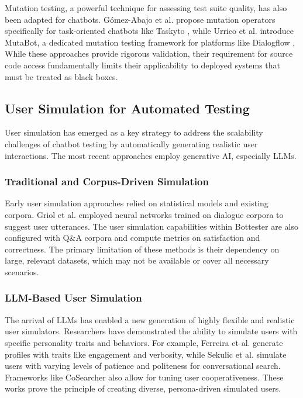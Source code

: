 Mutation testing, a powerful technique for assessing test suite quality,
has also been adapted for chatbots.
Gómez-Abajo et al. \autocite{gomez-abajoMutationTestingTaskOriented2024}
propose mutation operators specifically for task-oriented chatbots like Taskyto \autocite{sanchezcuadradoAutomatingDevelopmentTaskoriented2024},
while Urrico et al. \autocite{urricoMutaBotMutationTesting2024} introduce MutaBot,
a dedicated mutation testing framework for platforms like Dialogflow \autocite{Dialogflow},
While these approaches provide rigorous validation,
their requirement for source code access
fundamentally limits their applicability to deployed systems
that must be treated as black boxes.

\subsection{User Simulation for Automated Testing}

User simulation has emerged as a key strategy to
address the scalability challenges of chatbot testing
by automatically generating realistic user interactions.
The most recent approaches employ generative \acl{AI},
especially \acp {LLM}.

\subsubsection{Traditional and Corpus-Driven Simulation}

Early user simulation approaches
relied on statistical models and existing corpora.
Griol et al. \autocite{griolAutomaticDialogSimulation2013}
employed neural networks trained on dialogue corpora
to suggest user utterances.
The user simulation capabilities within Bottester
\autocite{vasconcelosBottesterTestingConversational2017}
are also configured with Q\&A corpora
and compute metrics on satisfaction and correctness.
The primary limitation of these methods is
their dependency on large, relevant datasets,
which may not be available or cover all necessary scenarios.

\subsubsection{LLM-Based User Simulation}

The arrival of \acp{LLM} has enabled a new generation
of highly flexible and realistic user simulators.
Researchers have demonstrated the ability
to simulate users with specific personality traits and behaviors.
For example, Ferreira et al. \autocite{ferreiraMultitraitUserSimulation2024}
generate profiles with traits like engagement and verbosity,
while Sekulic et al. \autocite{sekulicSimulatingConversationalSearch2024}
simulate users with varying levels of patience and politeness for conversational search.
Frameworks like CoSearcher \autocite{salleStudyingEffectivenessConversational2021}
also allow for tuning user cooperativeness.
These works prove the principle of creating diverse, persona-driven simulated users.

